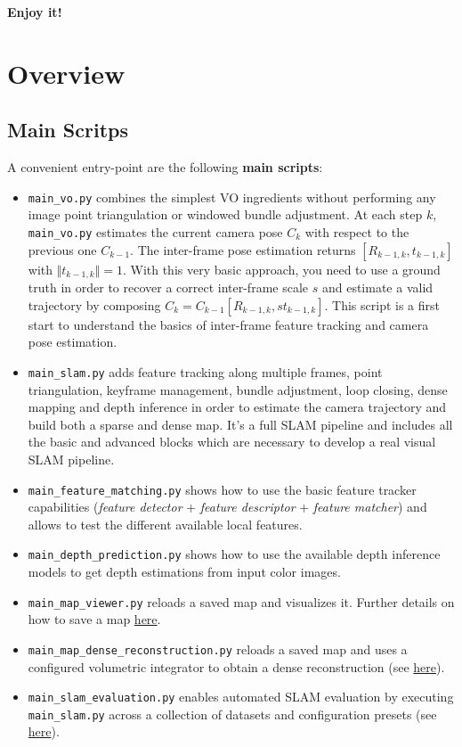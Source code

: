 \documentclass{article}
\begin{document}
\textbf{Enjoy it!}


\hypertarget{system_overview}{%
\section{Overview}}

\subsection{Main Scritps}

A convenient entry-point are the following \textbf{main scripts}:
\begin{itemize}
\item 
\texttt{main\_vo.py} combines the simplest VO
ingredients without performing any image point triangulation or windowed
bundle adjustment. At each step \(k\), \texttt{main\_vo.py} estimates
the current camera pose \(C_k\) with respect to the previous one
\(C_{k-1}\). The inter-frame pose estimation returns
\([R_{k-1,k},t_{k-1,k}]\) with \(\Vert t_{k-1,k} \Vert=1\). With this
very basic approach, you need to use a ground truth in order to recover
a correct inter-frame scale \(s\) and estimate a valid trajectory by
composing \(C_k = C_{k-1} [R_{k-1,k}, s t_{k-1,k}]\). This script is a
first start to understand the basics of inter-frame feature tracking and
camera pose estimation.
\item
  \texttt{main\_slam.py} adds feature tracking along multiple frames,
  point triangulation, keyframe management, bundle adjustment, loop
  closing, dense mapping and depth inference in order to estimate the
  camera trajectory and build both a sparse and dense map. It's a full
  SLAM pipeline and includes all the basic and advanced blocks which are
  necessary to develop a real visual SLAM pipeline.
\item
  \texttt{main\_feature\_matching.py} shows how to use the basic feature
  tracker capabilities (\emph{feature detector} + \emph{feature
  descriptor} + \emph{feature matcher}) and allows to test the different
  available local features.
\item
  \texttt{main\_depth\_prediction.py} shows how to use the available
  depth inference models to get depth estimations from input color
  images.
\item
  \texttt{main\_map\_viewer.py} reloads a saved map and visualizes it.
  Further details on how to save a map
  \protect\hyperlink{reload-a-saved-map-and-relocalize-in-it}{here}.
\item
  \texttt{main\_map\_dense\_reconstruction.py} reloads a saved map and
  uses a configured volumetric integrator to obtain a dense
  reconstruction (see
  \protect\hyperlink{volumetric-reconstruction}{here}).
  \item
  \texttt{main\_slam\_evaluation.py} enables automated SLAM evaluation
  by executing \texttt{main\_slam.py} across a collection of datasets
  and configuration presets (see
  \protect\hyperlink{evaluating-slam}{here}).
\end{itemize}
\end{document}
